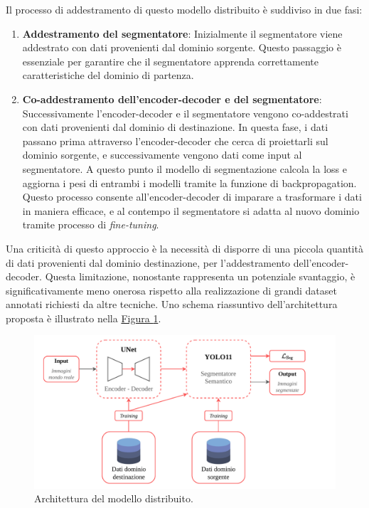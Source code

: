 \documentclass[12pt]{report}
\begin{document}
Il processo di addestramento di questo modello distribuito è suddiviso in due fasi:

\begin{enumerate}
	\item \textbf{Addestramento del segmentatore}: Inizialmente il segmentatore viene addestrato con dati provenienti dal dominio sorgente. Questo passaggio è essenziale per garantire che il segmentatore apprenda correttamente caratteristiche del dominio di partenza.
	
	\item \textbf{Co-addestramento dell'encoder-decoder e del segmentatore}: Successivamente l'encoder-decoder e il segmentatore vengono co-addestrati con dati provenienti dal dominio di destinazione. In questa fase, i dati passano prima attraverso l'encoder-decoder che cerca di proiettarli sul dominio sorgente, e successivamente vengono dati come input al segmentatore. A questo punto il modello di segmentazione calcola la loss e aggiorna i pesi di entrambi i modelli tramite la funzione di backpropagation. Questo processo consente all'encoder-decoder di imparare a trasformare i dati in maniera efficace, e al contempo il segmentatore si adatta al nuovo dominio tramite processo di \textit{fine-tuning}.
\end{enumerate}

Una criticità di questo approccio è la necessità di disporre di una piccola quantità di dati provenienti dal dominio destinazione, per l'addestramento dell'encoder-decoder. Questa limitazione, nonostante rappresenta un potenziale svantaggio, è significativamente meno onerosa rispetto alla realizzazione di grandi dataset annotati richiesti da altre tecniche. Uno schema riassuntivo dell'architettura proposta è illustrato nella \hyperref[fig:architettura-unet-yolo]{Figura \ref{fig:architettura-unet-yolo}}.

\begin{figure}[t]
	\centering
	\includegraphics[width=\textwidth, clip]{images/unet-yolo-architecture}
	\caption{Architettura del modello distribuito.}
	\label{fig:architettura-unet-yolo}
\end{figure}
\end{document}
